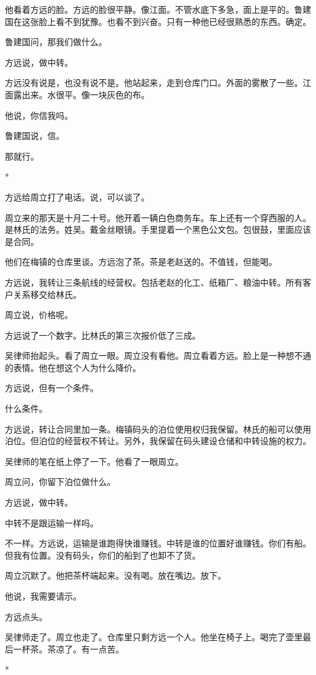 \documentclass[UTF8,a5paper,11pt,openany]{ctexbook}
\newcommand{\scene}{\vspace{1em}\begin{center}*\quad*\quad*\end{center}\vspace{0.5em}}
\begin{document}
他看着方远的脸。方远的脸很平静。像江面。不管水底下多急，面上是平的。鲁建国在这张脸上看不到犹豫。也看不到兴奋。只有一种他已经很熟悉的东西。确定。

鲁建国问，那我们做什么。

方远说，做中转。

方远没有说是，也没有说不是。他站起来，走到仓库门口。外面的雾散了一些。江面露出来。水很平。像一块灰色的布。

他说，你信我吗。

鲁建国说，信。

那就行。


\scene

方远给周立打了电话。说，可以谈了。

周立来的那天是十月二十号。他开着一辆白色商务车。车上还有一个穿西服的人。是林氏的法务。姓吴。戴金丝眼镜。手里提着一个黑色公文包。包很鼓，里面应该是合同。

他们在梅镇的仓库里谈。方远泡了茶。茶是老赵送的。不值钱，但能喝。

方远说，我转让三条航线的经营权。包括老赵的化工、纸箱厂、粮油中转。所有客户关系移交给林氏。

周立说，价格呢。

方远说了一个数字。比林氏的第三次报价低了三成。

吴律师抬起头。看了周立一眼。周立没有看他。周立看着方远。脸上是一种想不通的表情。他在想这个人为什么降价。

方远说，但有一个条件。

什么条件。

方远说，转让合同里加一条。梅镇码头的泊位使用权归我保留。林氏的船可以使用泊位。但泊位的经营权不转让。另外，我保留在码头建设仓储和中转设施的权力。

吴律师的笔在纸上停了一下。他看了一眼周立。

周立问，你留下泊位做什么。

方远说，做中转。

中转不是跟运输一样吗。

不一样。方远说，运输是谁跑得快谁赚钱。中转是谁的位置好谁赚钱。你们有船。但我有位置。没有码头，你们的船到了也卸不了货。

周立沉默了。他把茶杯端起来。没有喝。放在嘴边。放下。

他说，我需要请示。

方远点头。

吴律师走了。周立也走了。仓库里只剩方远一个人。他坐在椅子上。喝完了壶里最后一杯茶。茶凉了。有一点苦。


\scene
\end{document}
